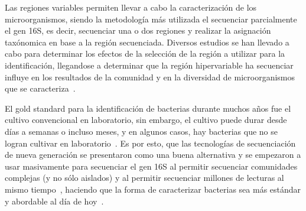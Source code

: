 Las regiones variables permiten llevar a cabo la caracterización de los microorganismos, siendo la metodología más utilizada el secuenciar parcialmente el gen 16S, es decir, secuenciar una o dos regiones y realizar la asignación taxónomica en base a la región secuenciada. Diversos estudios se han llevado a cabo para determinar los efectos de la selección de la región a utilizar para la identificación, llegandose a determinar que la región hipervariable ha secuenciar influye en los resultados de la comunidad y en la diversidad de microorganismos que se caracteriza~\cite{klindworth2013evaluation,mizrahi2013taxonomic,guo2013taxonomic,soergel2012selection}.




El gold standard para la identificación de bacterias durante muchos años fue el cultivo convencional en laboratorio, sin embargo, el cultivo puede durar desde días a semanas o incluso meses, y en algunos casos, hay bacterias que no se logran cultivar en laboratorio~\cite{didelot2012transforming}. 
Es por esto, que las tecnologías de secuenciación de nueva generación se presentaron como una buena alternativa y se empezaron a usar masivamente para secuenciar el gen 16S al permitir secuenciar comunidades complejas (y no sólo aislados) y al permitir secuenciar millones de lecturas al mismo tiempo~\cite{reller2007detection}, haciendo que la forma de caracterizar bacterias sea más estándar y abordable al día de hoy~\cite{woo2008then, tanner1994impact}. 

